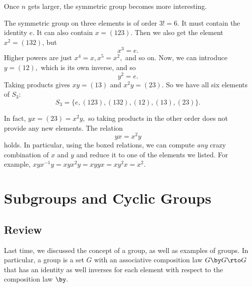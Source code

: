 Once $n$ gets larger, the symmetric group becomes more interesting. 
\begin{example}[$S_3$]
The symmetric group on three elements is of order $3! = 6.$ It must contain the identity $e.$ It can also contain $x = (123).$ Then we also get the element $x^2 = (132)$, but \[\boxed{x^3 = e.}\] Higher powers are just $x^4 = x, x^5 = x^2,$ and so on. Now, we can introduce $y = (12),$ which is its own inverse, and so \[\boxed{y^2 = e}.\] Taking products gives $xy = (13)$ and $x^2y = (23).$ So we have all six elements of $S_3$:
\[
S_3 = \{e, (123), (132), (12), (13), (23)\}.
\]

In fact, $yx = (23) = x^2y,$ so taking products in the other order does not provide any new elements. The relation
\[
\boxed{yx = x^2y}
\]
holds. In particular, using the boxed relations, we can compute \emph{any} crazy combination of $x$ and $y$ and reduce it to one of the elements we listed. For example, $xyx^{-1}y = xyx^2y = xyyx = xy^2x = x^2.$ 
\end{example}

\newpage


\section{Subgroups and Cyclic Groups}
\subsection{Review}
Last time, we discussed the concept of a group, as well as examples of groups. In particular, a group is a set $G$ with an associative composition law $G \by G \rto G$ that has an identity as well inverses for each element with respect to the composition law $\by.$ 

